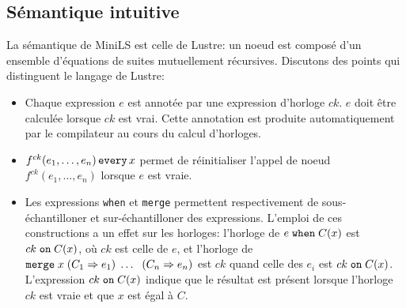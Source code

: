 \documentclass[a4paper]{article}
\newcommand{\lustre}{{\sc Lustre}}
\newcommand{\minils}{{\sc MiniLS}}
\newcommand{\mybox}[1]{\mbox{\tt{#1}}}
\newcommand{\Every}[4]{#1^{ck}(#2,\dots,#3) \, \mybox{every} \, #4}
\newcommand{\When}[3]{#1 \; \mybox{when} \; #2(#3)}
\newcommand{\Merge}[5]{\mybox{merge} \; #1 \; (#2 \Rightarrow #3) \; \dots \; \
  (#4 \Rightarrow #5)}
\newcommand{\On}[3]{#1 \; \mybox{on} \; #2 (#3)}
\begin{document}
\subsection{S\'emantique intuitive}
La s\'emantique de \minils{} est celle de \lustre: un noeud est compos\'e d'un ensemble
d'\'equations de suites mutuellement r\'ecursives. Discutons des points qui distinguent
le langage de \lustre:

\begin{itemize}
\item
Chaque expression $e$ est annot\'ee par une expression d'horloge $ck$. $e$ doit
\^etre calcul\'ee lorsque $ck$ est vrai. Cette annotation est produite automatiquement
par le compilateur au cours du calcul d'horloges.
\item
$\Every{f}{e_1}{e_n}{x}$ permet de r\'einitialiser l'appel de noeud $f^{ck}(e_1,...,e_n)$
lorsque $e$ est vraie.
\item



Les expressions \texttt{when} et \texttt{merge} permettent respectivement de
sous-\'echantilloner et sur-\'echantilloner des expressions. L'emploi de ces
constructions a un effet sur les horloges: l'horloge de $\When{e}{C}{x}$ est
$\On{ck}{C}{x}$, o\`u $ck$ est celle de $e$, et l'horloge de
$\Merge{x}{C_1}{e_1}{C_n}{e_n}$ est $ck$ quand celle des $e_i$ est
$\On{ck}{C}{x}$. L'expression $\On{ck}{C}{x}$ indique que le r\'esultat est
pr\'esent lorsque l'horloge $ck$ est vraie et que $x$ est \'egal \`a $C$.


\end{itemize}
\end{document}
